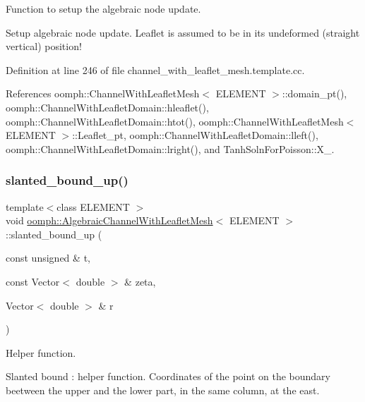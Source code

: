 Function to setup the algebraic node update. 

Setup algebraic node update. Leaflet is assumed to be in its undeformed (straight vertical) position! 

Definition at line 246 of file channel\+\_\+with\+\_\+leaflet\+\_\+mesh.\+template.\+cc.



References oomph\+::\+Channel\+With\+Leaflet\+Mesh$<$ E\+L\+E\+M\+E\+N\+T $>$\+::domain\+\_\+pt(), oomph\+::\+Channel\+With\+Leaflet\+Domain\+::hleaflet(), oomph\+::\+Channel\+With\+Leaflet\+Domain\+::htot(), oomph\+::\+Channel\+With\+Leaflet\+Mesh$<$ E\+L\+E\+M\+E\+N\+T $>$\+::\+Leaflet\+\_\+pt, oomph\+::\+Channel\+With\+Leaflet\+Domain\+::lleft(), oomph\+::\+Channel\+With\+Leaflet\+Domain\+::lright(), and Tanh\+Soln\+For\+Poisson\+::\+X\+\_.

\mbox{\label{classoomph_1_1AlgebraicChannelWithLeafletMesh_ab3659949ea5faac4ffa981828e98cf53}} 
\subsubsection{\texorpdfstring{slanted\+\_\+bound\+\_\+up()}{slanted\_bound\_up()}}
{\footnotesize\ttfamily template$<$class E\+L\+E\+M\+E\+NT $>$ \\
void \hyperlink{classoomph_1_1AlgebraicChannelWithLeafletMesh}{oomph\+::\+Algebraic\+Channel\+With\+Leaflet\+Mesh}$<$ E\+L\+E\+M\+E\+NT $>$\+::slanted\+\_\+bound\+\_\+up (\begin{DoxyParamCaption}\item[{const unsigned \&}]{t,  }\item[{const Vector$<$ double $>$ \&}]{zeta,  }\item[{Vector$<$ double $>$ \&}]{r }\end{DoxyParamCaption})\hspace{0.3cm}{\ttfamily [protected]}}



Helper function. 

Slanted bound \+: helper function. Coordinates of the point on the boundary beetween the upper and the lower part, in the same column, at the east. 

